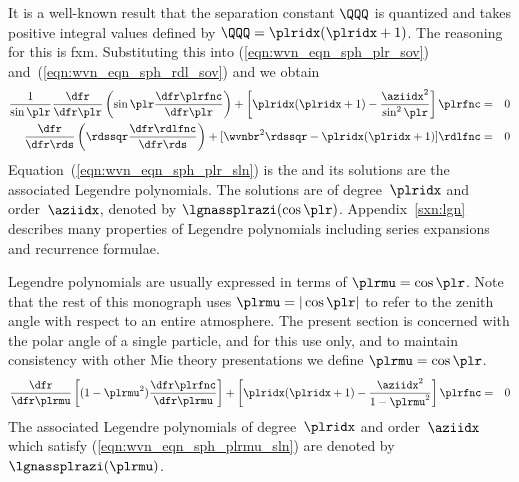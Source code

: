 \documentclass[12pt]{article}
\begin{document}
It is a well-known result that the separation constant $\QQQ$ is
quantized and takes positive integral values defined by 
$\QQQ = \plridx(\plridx+1)$.
The reasoning for this is fxm.
Substituting this into (\ref{eqn:wvn_eqn_sph_plr_sov})
and~(\ref{eqn:wvn_eqn_sph_rdl_sov}) and we obtain
\begin{eqnarray}
\label{eqn:wvn_eqn_sph_plr_sln}
\frac{1}{\sin\plr} \frac{\dfr}{\dfr\plr}
\left( \sin\plr \frac{\dfr\plrfnc}{\dfr\plr} \right) 
+ \left[ \plridx(\plridx+1) - \frac{\aziidx^{2}}{\sin^{2}\plr} \right] \plrfnc
& = & 0 \\
\label{eqn:wvn_eqn_sph_rdl_sln}
\frac{\dfr}{\dfr\rds} 
\left( \rdssqr \frac{\dfr\rdlfnc}{\dfr\rds} \right) +
[ \wvnbr^{2}\rdssqr - \plridx(\plridx+1) ] \rdlfnc
& = & 0
\end{eqnarray}
Equation~(\ref{eqn:wvn_eqn_sph_plr_sln}) is the 
 and its solutions are the 
associated Legendre polynomials.
The solutions are  of degree~$\plridx$
and order~$\aziidx$, denoted by $\lgnassplrazi(\cos\plr)$.
Appendix~\ref{sxn:lgn} describes many properties of Legendre
polynomials including series expansions and recurrence formulae.

Legendre polynomials are usually expressed in terms of 
$\plrmu = \cos\plr$.
Note that the rest of this monograph uses 
$\plrmu = |\cos\plr|$ to refer to the zenith angle with respect to
an entire atmosphere.
The present section is concerned with the polar angle of a single
particle, and for this use only, and to maintain consistency with
other Mie theory presentations \cite[e.g.,][]{BoH83,Lio02} we define 
$\plrmu = \cos\plr$.
\begin{eqnarray}
\frac{\dfr}{\dfr\plrmu}
\left[ (1 - \plrmu^{2}) \frac{\dfr\plrfnc}{\dfr\plrmu} \right] +
\left[ \plridx(\plridx+1) - \frac{\aziidx^{2}}{1-\plrmu^{2}} \right] \plrfnc
& = & 0
\label{eqn:wvn_eqn_sph_plrmu_sln}
\end{eqnarray}
The associated Legendre polynomials of degree~$\plridx$ and
order~$\aziidx$ which satisfy (\ref{eqn:wvn_eqn_sph_plrmu_sln}) are
denoted by $\lgnassplrazi(\plrmu)$. 
\end{document}
